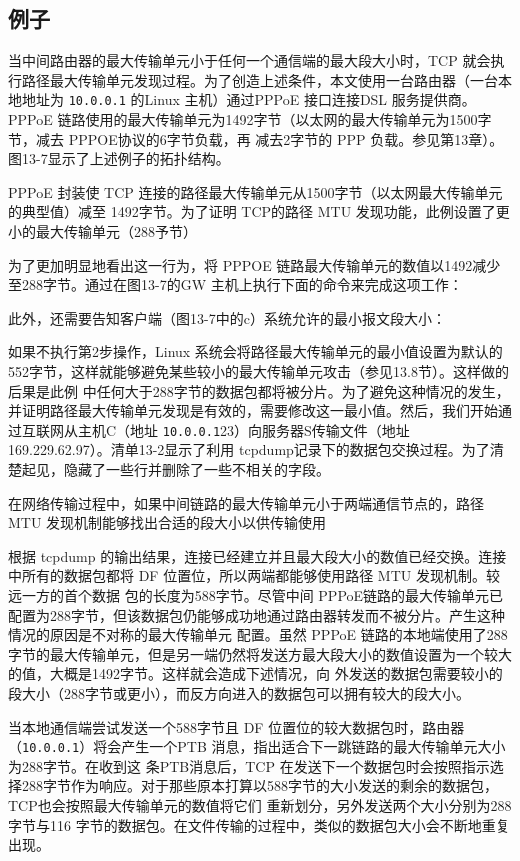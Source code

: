 \subsection{例子}
当中间路由器的最大传输单元小于任何一个通信端的最大段大小时，TCP 就会执行路径最大传输单元发现过程。为了创造上述条件，本文使用一台路由器（一台本地地址为
\verb|10.0.0.1| 的Linux 主机）通过PPPoE 接口连接DSL 服务提供商。PPPoE 链路使用的最大传输单元为1492字节（以太网的最大传输单元为1500字节，减去 PPPOE协议的6字节负载，再
减去2字节的 PPP 负载。参见第13章）。图13-7显示了上述例子的拓扑结构。

PPPoE 封装使 TCP 连接的路径最大传输单元从1500字节（以太网最大传输单元的典型值）减至
1492字节。为了证明 TCP的路径 MTU 发现功能，此例设置了更小的最大传输单元（288予节）

为了更加明显地看出这一行为，将 PPPOE 链路最大传输单元的数值以1492减少至288字节。通过在图13-7的GW 主机上执行下面的命令来完成这项工作：

此外，还需要告知客户端（图13-7中的c）系统允许的最小报文段大小：

如果不执行第2步操作，Linux 系统会将路径最大传输单元的最小值设置为默认的552字节，这样就能够避免某些较小的最大传输单元攻击（参见13.8节）。这样做的后果是此例
中任何大于288字节的数据包都将被分片。为了避免这种情况的发生，并证明路径最大传输单元发现是有效的，需要修改这一最小值。然后，我们开始通过互联网从主机C（地址
\verb|10.0.0.1|23）向服务器S传输文件（地址 169.229.62.97）。清单13-2显示了利用 tcpdump记录下的数据包交换过程。为了清楚起见，隐藏了一些行并删除了一些不相关的字段。

在网络传输过程中，如果中间链路的最大传输单元小于两端通信节点的，路径MTU 发现机制能够找出合适的段大小以供传输使用

根据 tcpdump 的输出结果，连接已经建立并且最大段大小的数值已经交换。连接中所有的数据包都将 DF 位置位，所以两端都能够使用路径 MTU 发现机制。较远一方的首个数据
包的长度为588字节。尽管中间 PPPoE链路的最大传输单元已配置为288字节，但该数据包仍能够成功地通过路由器转发而不被分片。产生这种情况的原因是不对称的最大传输单元
配置。虽然 PPPoE 链路的本地端使用了288字节的最大传输单元，但是另一端仍然将发送方最大段大小的数值设置为一个较大的值，大概是1492字节。这样就会造成下述情况，向
外发送的数据包需要较小的段大小（288字节或更小），而反方向进入的数据包可以拥有较大的段大小。

当本地通信端尝试发送一个588字节且 DF 位置位的较大数据包时，路由器（\verb|10.0.0.1|）将会产生一个PTB 消息，指出适合下一跳链路的最大传输单元大小为288字节。在收到这
条PTB消息后，TCP 在发送下一个数据包时会按照指示选择288字节作为响应。对于那些原本打算以588字节的大小发送的剩余的数据包，TCP也会按照最大传输单元的数值将它们
重新划分，另外发送两个大小分别为288 字节与116 字节的数据包。在文件传输的过程中，类似的数据包大小会不断地重复出现。

